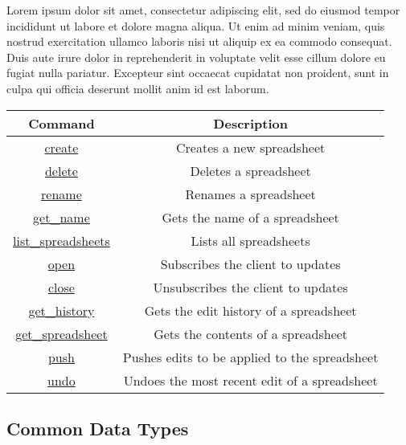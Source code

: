 Lorem ipsum dolor sit amet, consectetur adipiscing elit, sed do eiusmod tempor incididunt ut labore et dolore magna aliqua. Ut enim ad minim veniam, quis nostrud exercitation ullamco laboris nisi ut aliquip ex ea commodo consequat. Duis aute irure dolor in reprehenderit in voluptate velit esse cillum dolore eu fugiat nulla pariatur. Excepteur sint occaecat cupidatat non proident, sunt in culpa qui officia deserunt mollit anim id est laborum.

\begin{table}[h!]
    \begin{center}
        \begin{tabular}{|c|c|}\hline
        Command & Description \\\hline
        \hyperref[sec:message:create]{create} & Creates a new spreadsheet \\\hline
        \hyperref[sec:message:delete]{delete} & Deletes a spreadsheet \\\hline
        \hyperref[sec:message:rename]{rename} & Renames a spreadsheet \\\hline
        \hyperref[sec:message:get_name]{get\_name} & Gets the name of a spreadsheet \\\hline
        \hyperref[sec:message:list]{list\_spreadsheets} & Lists all spreadsheets \\\hline
        \hyperref[sec:message:open]{open} & Subscribes the client to updates \\\hline
        \hyperref[sec:message:close]{close} & Unsubscribes the client to updates \\\hline
        \hyperref[sec:message:get_history]{get\_history} & Gets the edit history of a spreadsheet \\\hline
        \hyperref[sec:message:get_spreadsheet]{get\_spreadsheet} & Gets the contents of a spreadsheet \\\hline
        \hyperref[sec:message:push]{push} & Pushes edits to be applied to the spreadsheet \\\hline
        \hyperref[sec:message:undo]{undo} & Undoes the most recent edit of a spreadsheet \\\hline
        \end{tabular}
    \end{center}
\end{table}

\lstset{language=json,frame=single,numbers=none,captionpos=b}

\subsection{Common Data Types}

